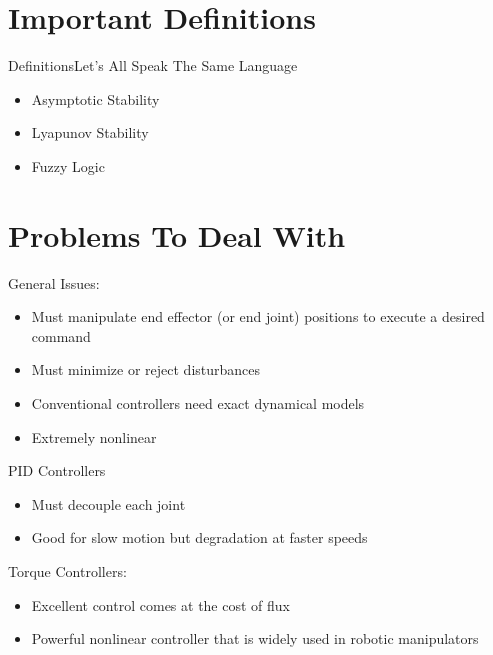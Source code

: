 \documentclass{beamer}
\begin{document}
\section[Definitions]{Important Definitions}
\begin{frame}{Definitions}{Let's All Speak The Same Language}
\begin{itemize}
	\item Asymptotic Stability
	\item Lyapunov Stability
	\item Fuzzy Logic
\end{itemize}
\end{frame}



\section[Problems]{Problems To Deal With}
\begin{frame}
General Issues:
\begin{itemize}
	\item Must manipulate end effector (or end joint) positions to execute a desired command \cite{piltan}
	\item Must minimize or reject disturbances \cite{piltan,6954103}
	\item Conventional controllers need exact dynamical models \cite{piltan}
	\item Extremely nonlinear \cite{SONG2005208,1035149,piltan}
\end{itemize}
PID Controllers\cite{SONG2005208}
\begin{itemize}
	\item Must decouple each joint
	\item Good for slow motion but degradation at faster speeds
\end{itemize}
Torque Controllers:
\begin{itemize}
	\item Excellent control comes at the cost of flux \cite{6954103}
	\item Powerful nonlinear controller that is widely used in robotic manipulators
\end{itemize}
\end{frame}
\end{document}
